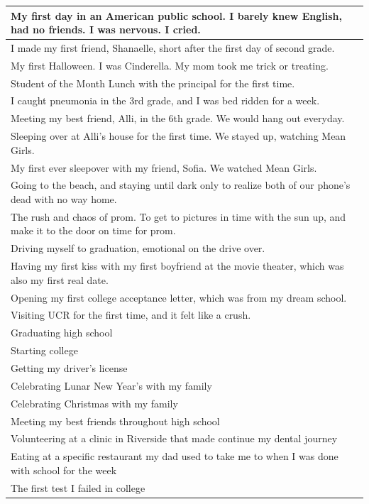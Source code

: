 \documentclass[
  .7em,
  letterpaper,
  DIV=11,
  numbers=noendperiod]{scrartcl}
\begin{document}
\begin{table}
\begin{tabular}{l}
\hline
My first day in an American public school. I barely knew English, had no friends. I was nervous. I cried.\\
\hline
I made my first friend, Shanaelle, short after the first day of second grade.\\
\hline
My first Halloween. I was Cinderella. My mom took me trick or treating.\\
\hline
Student of the Month Lunch with the principal for the first time.\\
\hline
I caught pneumonia in the 3rd grade, and I was bed ridden for a week.\\
\hline
Meeting my best friend, Alli, in the 6th grade. We would hang out everyday.\\
\hline
Sleeping over at Alli's house for the first time. We stayed up, watching Mean Girls.\\
\hline
My first ever sleepover with my friend, Sofia. We watched Mean Girls.\\
\hline
Going to the beach, and staying until dark only to realize both of our phone's dead with no way home.\\
\hline
The rush and chaos of prom. To get to pictures in time with the sun up, and make it to the door on time for prom.\\
\hline
Driving myself to graduation, emotional on the drive over.\\
\hline
Having my first kiss with my first boyfriend at the movie theater, which was also my first real date.\\
\hline
Opening my first college acceptance letter, which was from my dream school.\\
\hline
Visiting UCR for the first time, and it felt like a crush.\\
\hline
Graduating high school\\
\hline
Starting college\\
\hline
Getting my driver's license\\
\hline
Celebrating Lunar New Year's with my family\\
\hline
Celebrating Christmas with my family\\
\hline
Meeting my best friends throughout high school\\
\hline
Volunteering at a clinic in Riverside that made continue my dental journey\\
\hline
Eating at a specific restaurant my dad used to take me to when I was done with school for the week\\
\hline
The first test I failed in college\\

\end{tabular}
\end{table}
\end{document}
